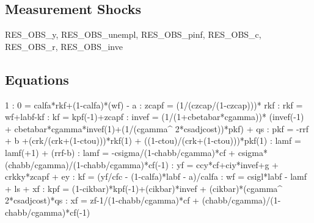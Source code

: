 \documentclass{article}%
\begin{document}
%
\subsection{Measurement Shocks}%
\label{subsec:MeasurementShocks}%
RES\_OBS\_y, RES\_OBS\_unempl, RES\_OBS\_pinf, RES\_OBS\_c, RES\_OBS\_r, RES\_OBS\_inve

%
\subsection{Equations}%
\label{subsec:Equations}%
 1    :  0 =  calfa*rkf+(1{-}calfa)*(wf) {-} a\newline%
    :  zcapf =  (1/(czcap/(1{-}czcap)))* rkf\newline%
    :  rkf =  wf+labf{-}kf\newline%
    :  kf =  kpf({-}1)+zcapf\newline%
    :  invef = (1/(1+cbetabar*cgamma))* (invef({-}1) + cbetabar*cgamma*invef(1)+(1/(cgamma\^{} 2*csadjcost))*pkf) + qs\newline%
    :  pkf = {-}rrf + b  +(crk/(crk+(1{-}ctou)))*rkf(1) +  ((1{-}ctou)/(crk+(1{-}ctou)))*pkf(1)\newline%
    :  lamf = lamf(+1) + (rrf{-}b)\newline%
    :  lamf = {-}csigma/(1{-}chabb/cgamma)*cf + csigma*(chabb/cgamma)/(1{-}chabb/cgamma)*cf({-}1)\newline%
    :  yf = ccy*cf+ciy*invef+g  +  crkky*zcapf  + ey\newline%
   :  kf = (yf/cfc {-} (1{-}calfa)*labf {-} a)/calfa\newline%
   :  wf = csigl*labf {-} lamf + ls + xf\newline%
   :  kpf = (1{-}cikbar)*kpf({-}1)+(cikbar)*invef + (cikbar)*(cgamma\^{} 2*csadjcost)*qs\newline%
   :  xf = zf{-}1/(1{-}chabb/cgamma)*cf + (chabb/cgamma)/(1{-}chabb/cgamma)*cf({-}1)\newline%
\end{document}
